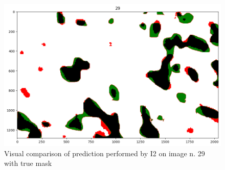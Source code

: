 \begin{figure}[H]
 \centering
 \includegraphics[scale=0.6]{./resources/I2_comp_29.png}
 \caption[I2 test prediction comparison]
    {Visual comparison of prediction performed by I2 on image n. 29 with true mask}
\end{figure}